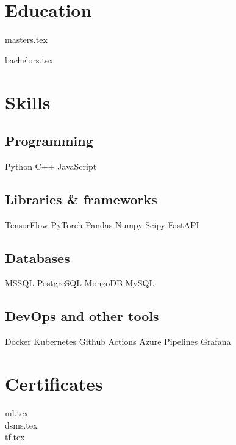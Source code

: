 \documentclass[]{deedy-resume-openfont}
\begin{document}
\sectionsep

\section{Education}

{masters.tex}

\sectionsep

{bachelors.tex}

\sectionsep

\section{Skills}
\begin{minipage}[t]{.6\textwidth}
\subsection{Programming}
Python \textbullet{}   C++ \textbullet{} JavaScript
\subsection{Libraries \& frameworks}
TensorFlow \textbullet{} PyTorch \textbullet{} Pandas \textbullet{} Numpy \textbullet{} Scipy \textbullet{} FastAPI
\subsection{Databases}
MSSQL \textbullet{} PostgreSQL \textbullet{} MongoDB \textbullet{} MySQL
\subsection{DevOps and other tools}
Docker \textbullet{} Kubernetes \textbullet{} Github Actions \textbullet{} Azure Pipelines \textbullet{} Grafana
\sectionsep
\end{minipage}

\sectionsep

\section{Certificates}
{ml.tex}
\vspace{\topsep}\\
{dsms.tex}
\vspace{\topsep}\\
{tf.tex}




\end{document}
